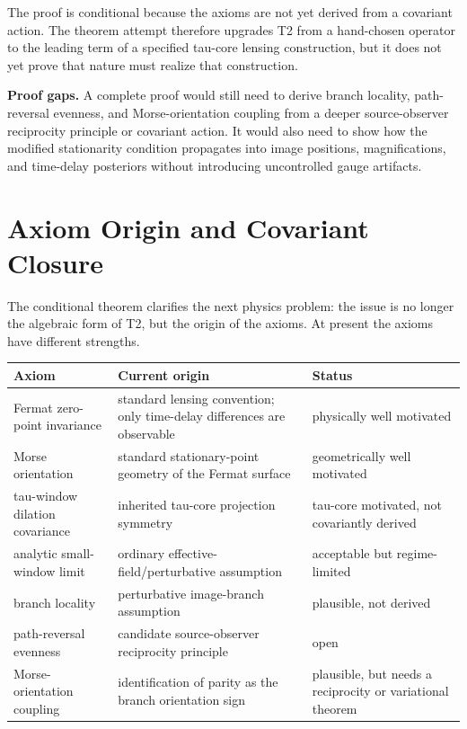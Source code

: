 \documentclass[11pt]{article}
\newcounter{none} %
\begin{document}
The proof is conditional because the axioms are not yet derived from a
covariant action. The theorem attempt therefore upgrades T2 from a
hand-chosen operator to the leading term of a specified tau-core lensing
construction, but it does not yet prove that nature must realize that
construction.

\textbf{Proof gaps.} A complete proof would still need to derive branch
locality, path-reversal evenness, and Morse-orientation coupling from a
deeper source-observer reciprocity principle or covariant action. It
would also need to show how the modified stationarity condition
propagates into image positions, magnifications, and time-delay
posteriors without introducing uncontrolled gauge artifacts.

\section{Axiom Origin and Covariant
Closure}\label{axiom-origin-and-covariant-closure}

The conditional theorem clarifies the next physics problem: the issue is
no longer the algebraic form of T2, but the origin of the axioms. At
present the axioms have different strengths.

{\def\LTcaptype{none} %
\begin{longtable}[]{@{}
  >{\raggedright\arraybackslash}p{}
  >{\raggedright\arraybackslash}p{}
  >{\raggedright\arraybackslash}p{}@{}}
\toprule\noalign{}
\begin{minipage}[b]{\linewidth}\raggedright
Axiom
\end{minipage} & \begin{minipage}[b]{\linewidth}\raggedright
Current origin
\end{minipage} & \begin{minipage}[b]{\linewidth}\raggedright
Status
\end{minipage} \\
\midrule\noalign{}
\endhead
\bottomrule\noalign{}
\endlastfoot
Fermat zero-point invariance & standard lensing convention; only
time-delay differences are observable & physically well motivated \\
Morse orientation & standard stationary-point geometry of the Fermat
surface & geometrically well motivated \\
tau-window dilation covariance & inherited tau-core projection symmetry
& tau-core motivated, not covariantly derived \\
analytic small-window limit & ordinary effective-field/perturbative
assumption & acceptable but regime-limited \\
branch locality & perturbative image-branch assumption & plausible, not
derived \\
path-reversal evenness & candidate source-observer reciprocity principle
& open \\
Morse-orientation coupling & identification of parity as the branch
orientation sign & plausible, but needs a reciprocity or variational
theorem \\
\end{longtable}
}
\end{document}
